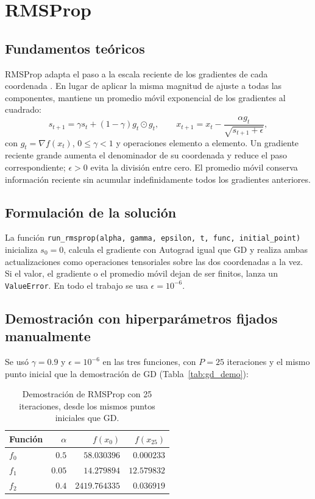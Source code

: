 \section{RMSProp}

\subsection{Fundamentos teóricos}

RMSProp adapta el paso a la escala reciente de los gradientes de cada
coordenada \cite{tieleman2012rmsprop,d2l_rmsprop}. En lugar de aplicar la
misma magnitud de ajuste a todas las componentes, mantiene un promedio
móvil exponencial de los gradientes al cuadrado:
\[
s_{t+1} = \gamma s_t + (1-\gamma)g_t\odot g_t, \qquad
x_{t+1} = x_t - \frac{\alpha g_t}{\sqrt{s_{t+1}+\epsilon}},
\]
con $g_t=\nabla f(x_t)$, $0\leq\gamma<1$ y operaciones elemento a elemento.
Un gradiente reciente grande aumenta el denominador de su coordenada y
reduce el paso correspondiente; $\epsilon>0$ evita la división entre cero.
El promedio móvil conserva información reciente sin acumular
indefinidamente todos los gradientes anteriores.

\subsection{Formulación de la solución}

La función
\texttt{run\_rmsprop(alpha, gamma, epsilon, t, func, initial\_point)}
inicializa $s_0=0$, calcula el gradiente con Autograd igual que GD y realiza
ambas actualizaciones como operaciones tensoriales sobre las dos
coordenadas a la vez. Si el valor, el gradiente o el promedio móvil dejan
de ser finitos, lanza un \texttt{ValueError}. En todo el trabajo se usa
$\epsilon=10^{-6}$.

\subsection{Demostración con hiperparámetros fijados manualmente}

Se usó $\gamma=0.9$ y $\epsilon=10^{-6}$ en las tres funciones, con $P=25$
iteraciones y el mismo punto inicial que la demostración de GD
(Tabla~\ref{tab:gd_demo}):

\begin{table}[H]
\centering
\begin{tabular}{lrrr}
\toprule
Función & $\alpha$ & $f(x_0)$ & $f(x_{25})$ \\
\midrule
$f_0$ & $0.5$  & $58.030396$   & $0.000233$ \\
$f_1$ & $0.05$ & $14.279894$   & $12.579832$ \\
$f_2$ & $0.4$  & $2419.764335$ & $0.036919$ \\
\bottomrule
\end{tabular}
\caption{Demostración de RMSProp con 25 iteraciones, desde los mismos
puntos iniciales que GD.}
\label{tab:rms_demo}
\end{table}


